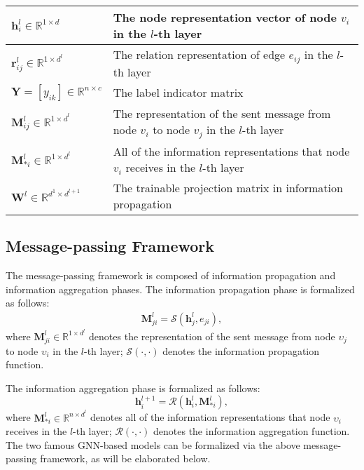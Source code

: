 \begin{table}[!h]
\begin{tabular}{l|p{5.5cm}}
                \midrule
                $\mathbf{h}_{i}^{l} \in \mathbb{R}^{1 \times d}$  & The node representation vector of node $v_{i}$ in the $l$-th layer \\
                \midrule
                 $\mathbf{r}_{ij}^{l} \in \mathbb{R}^{1 \times d^{l}}$  & The relation representation of edge $e_{ij}$ in the $l$-th layer \\
                \midrule
                $\mathbf{Y}=[y_{ik}] \in \mathbb{R}^{n \times c}$ & The label indicator matrix\\
                \midrule
                $\mathbf{M}^{l}_{ij}\in \mathbb{R}^{1 \times d^{l}}$ & The representation of the sent message from node $v_i$ to node $v_j$ in the $l$-th layer\\
                \midrule
                $\mathbf{M}^{l}_{*i}\in \mathbb{R}^{1 \times d^{l}}$ & All of the information representations that node $v_i$ receives in the $l$-th layer\\
                \midrule
                $\mathbf{W}^{l} \in \mathbb{R}^{d^{1} \times d^{l+1}}$ & The trainable projection matrix in information propagation \\
    		\bottomrule
    	\end{tabular}
	\label{tab:notation}
\end{table}

\subsection{Message-passing Framework} \label{sec:message}
The message-passing framework is composed of information propagation and information aggregation phases.
The information propagation phase is formalized as follows:
\begin{eqnarray}
    \mathbf{M}_{j i}^l=\mathcal{S}\left(\mathbf{h}_j^l, e_{j i}\right),
    \label{eq:1}
\end{eqnarray}
where $\mathbf{M}_{ji}^l \in \mathbb{R}^{1 \times d^{l}}$ denotes the representation of the sent message from node $\upsilon_{j}$ to node $\upsilon_{i}$ in the $l$-th layer; $\mathcal{S}(\cdot, \cdot)$ denotes the information propagation function.

The information aggregation phase is formalized as follows:
\begin{equation}
    \mathbf{h}_i^{l+1}=\mathcal{R}\left(\mathbf{h}_i^l, \mathbf{M}_{* i}^l\right),
    \label{eq:2}
\end{equation}
where $\mathbf{M}_{* i}^l \in \mathbb{R}^{n \times d^{l}}$ denotes all of the information representations that node $\upsilon_{i}$ receives in the $l$-th layer;
$\mathcal{R}(\cdot, \cdot)$ denotes the information aggregation function. 
The two famous GNN-based models can be formalized via the above message-passing framework, as will be elaborated below.

